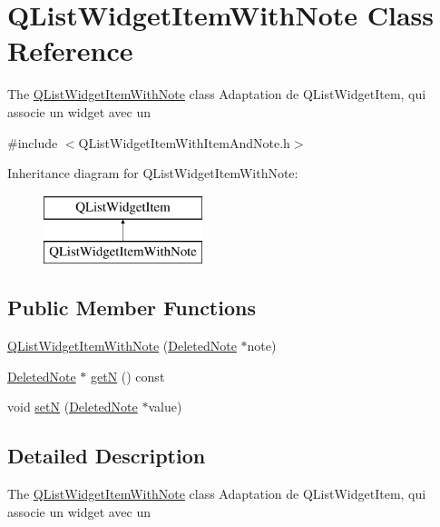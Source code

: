 \hypertarget{class_q_list_widget_item_with_note}{\section{Q\-List\-Widget\-Item\-With\-Note Class Reference}
\label{class_q_list_widget_item_with_note}
}


The \hyperlink{class_q_list_widget_item_with_note}{Q\-List\-Widget\-Item\-With\-Note} class Adaptation de Q\-List\-Widget\-Item, qui associe un widget avec un   




{\ttfamily \#include $<$Q\-List\-Widget\-Item\-With\-Item\-And\-Note.\-h$>$}

Inheritance diagram for Q\-List\-Widget\-Item\-With\-Note\-:\begin{figure}[H]
\begin{center}
\leavevmode
\includegraphics[height=2.000000cm]{class_q_list_widget_item_with_note}
\end{center}
\end{figure}
\subsection*{Public Member Functions}
\begin{DoxyCompactItemize}
\item 
\hyperlink{class_q_list_widget_item_with_note_a63e7dba71e411affbf95aeb7c275e945}{Q\-List\-Widget\-Item\-With\-Note} (\hyperlink{class_deleted_note}{Deleted\-Note} $\ast$note)
\item 
\hyperlink{class_deleted_note}{Deleted\-Note} $\ast$ \hyperlink{class_q_list_widget_item_with_note_a8022765b31962801f8a450c6e644ebd1}{get\-N} () const 
\item 
void \hyperlink{class_q_list_widget_item_with_note_a9f1dd85d0fb7d522a803e19fabbd4d18}{set\-N} (\hyperlink{class_deleted_note}{Deleted\-Note} $\ast$value)
\end{DoxyCompactItemize}


\subsection{Detailed Description}
The \hyperlink{class_q_list_widget_item_with_note}{Q\-List\-Widget\-Item\-With\-Note} class Adaptation de Q\-List\-Widget\-Item, qui associe un widget avec un  

